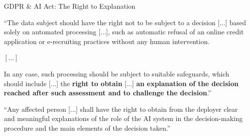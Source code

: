 \documentclass[11pt,compress,t,notes=noshow, aspectratio=169, xcolor=table]{beamer}
\begin{document}
\begin{frame}[t]{GDPR \& AI Act: The Right to Explanation}

``The data subject should have the right not to be subject to a decision
    [...] based solely on automated processing [...],
    such as automatic refusal of an online credit application or e-recruiting practices without any human intervention.

$[\ldots]$

In any case, such processing should be subject to suitable safeguards, which should include [...]
the \textbf{right to obtain} [...]
\textbf{an explanation of the decision reached after such assessment and to challenge the decision}.''
\hfill {}

\medskip

``Any affected person [...]
shall have the right to obtain from the deployer clear and meaningful explanations of the role of the AI system in the decision-making procedure and the main elements of the decision taken.''
\hfill {}
\end{frame}
\end{document}
